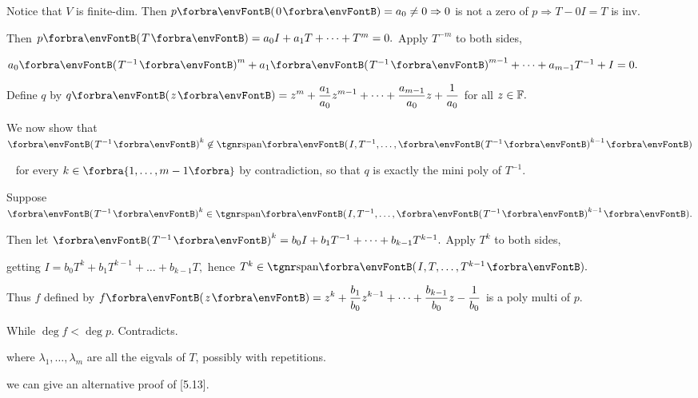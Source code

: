 \documentclass[a4paper, 11pt, UTF8]{article}
\begin{document}
\begin{large}
\par\quad
Notice that $V$ is finite-dim. Then $p\Par{0}=a_0\neq 0\Rightarrow 0$ is not a zero of $p\Rightarrow T-0I=T$ is inv.\par\quad
Then $p\Par{T}=a_0 I+a_1 T+\dots+T^m=0.$ Apply $T^{-m}$ to both sides,\par\quad
$a_0\Par{T^{-1}}^m+a_1\Par{T^{-1}}^{m-1}+\dots+a_{m-1}T^{-1}+I=0.$\par\quad
Define $q$ by $\displaystyle q\Par{z}=z^m+\frac{a_1}{a_0} z^{m-1}+\dots+\frac{a_{m-1}}{a_0}z+\frac{1}{a_0}$ for all $z\in{\mathbb{F}}.$\par\vspace{6pt}\quad
We now show that $\Par{T^{-1}}^k\not\in\Span{I,T^{-1},\dots,\Par{T^{-1}}^{k-1}}$\par\qquad\qquad\qquad\,\,\,
for every $k\in\Bra{1,\dots,m-1}$ by contradiction, so that $q$ is exactly the mini poly of $T^{-1}.$\par\quad
Suppose $\Par{T^{-1}}^k\in\Span{I,T^{-1},\dots,\Par{T^{-1}}^{k-1}}.$\par\quad
Then let $\Par{T^{-1}}^k=b_0 I+b_1 T^{-1}+\dots+b_{k-1}T^{k-1}.$ Apply $T^k$ to both sides,\par\qquad\qquad
 getting $I=b_0 T^k+b_1 T^{k-1}+\dots+b_{k-1}T,$ hence $T^k\in\Span{I,T,\dots,T^{k-1}}.$\par\vspace{6pt}\quad
Thus $f$ defined by $\displaystyle f\Par{z}=z^k+\frac{b_1}{b_0} z^{k-1}+\dots+\frac{b_{k-1}}{b_0} z-\frac{1}{b_0}$ is a poly multi of $p$.\par\quad
While $\deg f<\deg p.$ Contradicts.\PfEnd
\SepLine

\BulletPointX\NoteForSmall{[8.49]}\TextB{}
{\tgsl\large where $\lambda_1,\dots,\lambda_m$ are all the eigvals of $T$, {\tgsc possibly with repetitions}.}\par
\BulletPointX\Comment\TextB{}
we can {\tgsc give an alternative proof of [5.13]}.
\SepLine


\end{large}
\end{document}
